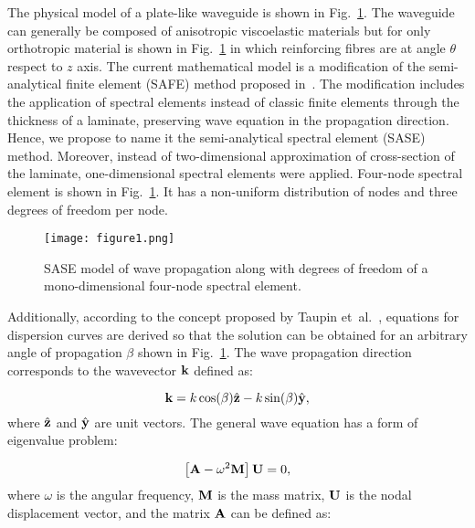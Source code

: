 The physical model of a plate-like waveguide is shown in Fig.~\ref{fig:layered_composite_SASE}.  
The waveguide can generally be composed of anisotropic viscoelastic materials but for   only orthotropic material is shown in Fig.~\ref{fig:layered_composite_SASE} in which reinforcing fibres are at angle \(\theta\)   respect to \(z\) axis. 
The current mathematical model is a modification of the semi-analytical finite element (SAFE) method proposed in~\cite{Bartoli2006}. 
The modification includes the application of spectral elements instead of classic finite elements through the thickness of a laminate, preserving wave equation in the propagation direction. 
Hence, we propose to name it the semi-analytical spectral element (SASE) method. Moreover, instead of two-dimensional approximation of cross-section of the laminate, one-dimensional spectral elements were applied. Four-node spectral element is shown in Fig.~\ref{fig:layered_composite_SASE}. It has a non-uniform distribution of nodes and three degrees of freedom per node.
	
		
\begin{figure} [h!]
		\centering
	\texttt{[image: figure1.png]}		
\caption{SASE model of wave propagation along with degrees of freedom of a mono-dimensional four-node spectral element.}
		\label{fig:layered_composite_SASE}
	\end{figure}
	
Additionally, according to the concept proposed by Taupin et~al.~\cite{Taupin2011}, equations for dispersion curves are derived so that the solution can be obtained for 
an arbitrary angle of propagation \(\beta\) shown in Fig.~\ref{fig:layered_composite_SASE}. 
The wave propagation direction corresponds to the wavevector \(\mathbf{k}\) defined as:
	
\begin{equation}
	  \mathbf{k} = k \cos (\beta)\hat{ \mathbf{z}} - k \sin (\beta) \hat{\mathbf{y}},
	\label{eq:wavevector}\end{equation}
where \(\hat{ \mathbf{z}}\) and \(\hat{\mathbf{y}}\) are unit vectors. 
The general wave equation has a form of eigenvalue problem:
	
\begin{equation}
	\left[\mathbf{A} - \omega^2\mathbf{M} \right] \mathbf{U} =0,
\label{eq:eig_dispersion}\end{equation}
	where \(\omega\) is the angular frequency, \(\mathbf{M}\) is the mass matrix, 
	\(\mathbf{U}\) is the nodal displacement vector, and the matrix \(\mathbf{A}\) can be 
	defined as:

